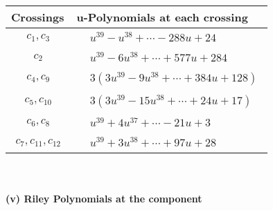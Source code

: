 \documentclass[1p]{elsarticle_modified}
\theoremstyle{definition}
\begin{document}
\begin{tabular}{m{50pt}|m{274pt}}
Crossings & \hspace{64pt}u-Polynomials at each crossing \\
\hline $$\begin{aligned}c_{1},c_{3}\end{aligned}$$&$\begin{aligned}
&u^{39}- u^{38}+\cdots-288 u+24
\end{aligned}$\\
\hline $$\begin{aligned}c_{2}\end{aligned}$$&$\begin{aligned}
&u^{39}-6 u^{38}+\cdots+577 u+284
\end{aligned}$\\
\hline $$\begin{aligned}c_{4},c_{9}\end{aligned}$$&$\begin{aligned}
&3(3 u^{39}-9 u^{38}+\cdots+384 u+128)
\end{aligned}$\\
\hline $$\begin{aligned}c_{5},c_{10}\end{aligned}$$&$\begin{aligned}
&3(3 u^{39}-15 u^{38}+\cdots+24 u+17)
\end{aligned}$\\
\hline $$\begin{aligned}c_{6},c_{8}\end{aligned}$$&$\begin{aligned}
&u^{39}+4 u^{37}+\cdots-21 u+3
\end{aligned}$\\
\hline $$\begin{aligned}c_{7},c_{11},c_{12}\end{aligned}$$&$\begin{aligned}
&u^{39}+3 u^{38}+\cdots+97 u+28
\end{aligned}$\\
\hline
\end{tabular}\\~\\
\newpage\renewcommand{\arraystretch}{1}
\flushleft \textbf{(v) Riley Polynomials at the component}\newline \\
\end{document}
